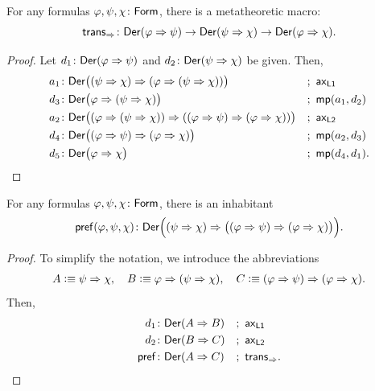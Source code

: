 \begin{lem}[Syllogism]
    \label{lem:hyp-syllogism}
    For any formulas\/ $\varphi,\psi,\chi\colon\fun{Form}$, there is a metatheoretic macro:
    \[
        \fun{trans}_{\imp}\colon
            \fun{Der}(\varphi\imp\psi)
            \to
            \fun{Der}(\psi\imp\chi)
            \to
            \fun{Der}(\varphi\imp\chi).
    \]
\end{lem}

\begin{proof}
    Let $d_1\colon\fun{Der}(\varphi\imp\psi)$ and $d_2\colon\fun{Der}(\psi\imp\chi)$ be given. Then,
    \begin{align*}
        a_1&\colon\fun{Der}\bigl(
            (\psi\imp\chi)\imp(\varphi\imp(\psi\imp\chi))
        \bigr)
            &&;\ \fun{ax}_{\fun{L1}}\\
        d_3&\colon\fun{Der}\bigl(
            \varphi\imp(\psi\imp\chi)
        \bigr)
            &&;\ \fun{mp}(a_1, d_2)\\
        a_2&\colon\fun{Der}\bigl(
            (\varphi\imp(\psi\imp\chi)) 
            \imp 
            ((\varphi\imp\psi)\imp(\varphi\imp\chi))
        \bigr)
            &&;\ \fun{ax}_{\fun{L2}}\\
        d_4&\colon\fun{Der}\bigl(
            (\varphi\imp\psi)\imp(\varphi\imp\chi)
        \bigr)
            &&;\ \fun{mp}(a_2, d_3)\\
        d_5&\colon\fun{Der}\bigl(
            \varphi\imp\chi
        \bigr)
            &&;\ \fun{mp}(d_4,d_1).
    \end{align*}
\end{proof}

\begin{lem}[Prefixing]\label{lem:prefixing}
    For any formulas\/ $\varphi,\psi,\chi\colon\fun{Form}$, there is an inhabitant
    \[
        \fun{pref}(\varphi,\psi,\chi)\colon\fun{Der}\Bigl(
            (\psi\imp \chi)\imp\bigl(
                (\varphi\imp\psi)\imp(\varphi\imp\chi)
            \bigr)
        \Bigr).
    \]
\end{lem}

\begin{proof}
    To simplify the notation, we introduce the abbreviations
    \begin{align*}
        A\mathrel{\vcentcolon}\equiv\psi\mathrel{\Rightarrow}\chi,\quad
        B\mathrel{\vcentcolon}\equiv\varphi\mathrel{\Rightarrow}(\psi\mathrel{\Rightarrow}\chi),\quad
        C\mathrel{\vcentcolon}\equiv(\varphi\mathrel{\Rightarrow}\psi)\mathrel{\Rightarrow}(\varphi\mathrel{\Rightarrow}\chi).
    \end{align*} 
    Then,
    \begin{align*}
        d_1&\colon\fun{Der}(A\imp B)
            &&;\ \fun{ax}_{\fun{L1}}\\
        d_2&\colon\fun{Der}(B\imp C)
            &&;\ \fun{ax}_{\fun{L2}}\\
        \fun{pref}&\colon\fun{Der}(A\imp C)
            &&;\ \fun{trans}_{\imp}.
    \end{align*}
\end{proof}

